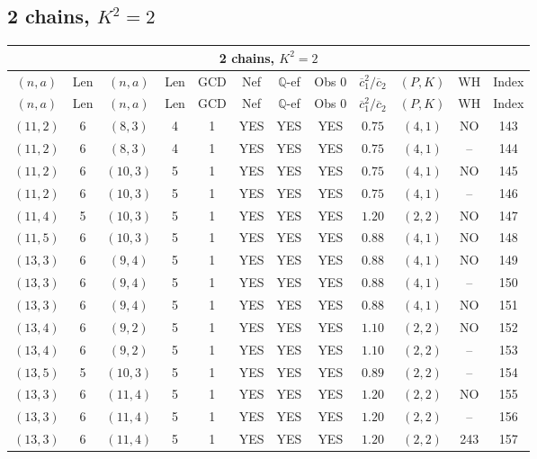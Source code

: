 \subsection{2 chains, $K^2 = 2$}
\begin{longtable}{|c|c|c|c|c|c|c|c|c|c|c|c|}
\hline
\multicolumn{12}{|c|}{2 chains, $K^2 = 2$}\\
\hline
$(n,a)$ & Len & $(n,a)$ & Len & GCD & Nef & $\mathbb Q$-ef & Obs 0 & $\overline c_1^2 / \overline c_2$ & $(P,K)$ & WH & Index\\
\hline
\endfirsthead

\hline
$(n,a)$ & Len & $(n,a)$ & Len & GCD & Nef & $\mathbb Q$-ef & Obs 0 & $\overline c_1^2 / \overline c_2$ & $(P,K)$ & WH & Index\\
\hline
\endhead
\hline
\endfoot

$(11,2)$ & 6 & $(8,3)$ & 4 & 1 & YES & YES & YES & $0.75$ & $(4,1)$ & NO & 143\\
$(11,2)$ & 6 & $(8,3)$ & 4 & 1 & YES & YES & YES & $0.75$ & $(4,1)$ & -- & 144\\
$(11,2)$ & 6 & $(10,3)$ & 5 & 1 & YES & YES & YES & $0.75$ & $(4,1)$ & NO & 145\\
$(11,2)$ & 6 & $(10,3)$ & 5 & 1 & YES & YES & YES & $0.75$ & $(4,1)$ & -- & 146\\
$(11,4)$ & 5 & $(10,3)$ & 5 & 1 & YES & YES & YES & $1.20$ & $(2,2)$ & NO & 147\\
$(11,5)$ & 6 & $(10,3)$ & 5 & 1 & YES & YES & YES & $0.88$ & $(4,1)$ & NO & 148\\
$(13,3)$ & 6 & $(9,4)$ & 5 & 1 & YES & YES & YES & $0.88$ & $(4,1)$ & NO & 149\\
$(13,3)$ & 6 & $(9,4)$ & 5 & 1 & YES & YES & YES & $0.88$ & $(4,1)$ & -- & 150\\
$(13,3)$ & 6 & $(9,4)$ & 5 & 1 & YES & YES & YES & $0.88$ & $(4,1)$ & NO & 151\\
$(13,4)$ & 6 & $(9,2)$ & 5 & 1 & YES & YES & YES & $1.10$ & $(2,2)$ & NO & 152\\
$(13,4)$ & 6 & $(9,2)$ & 5 & 1 & YES & YES & YES & $1.10$ & $(2,2)$ & -- & 153\\
$(13,5)$ & 5 & $(10,3)$ & 5 & 1 & YES & YES & YES & $0.89$ & $(2,2)$ & -- & 154\\
$(13,3)$ & 6 & $(11,4)$ & 5 & 1 & YES & YES & YES & $1.20$ & $(2,2)$ & NO & 155\\
$(13,3)$ & 6 & $(11,4)$ & 5 & 1 & YES & YES & YES & $1.20$ & $(2,2)$ & -- & 156\\
$(13,3)$ & 6 & $(11,4)$ & 5 & 1 & YES & YES & YES & $1.20$ & $(2,2)$ & 243 & 157\\

\end{longtable}
